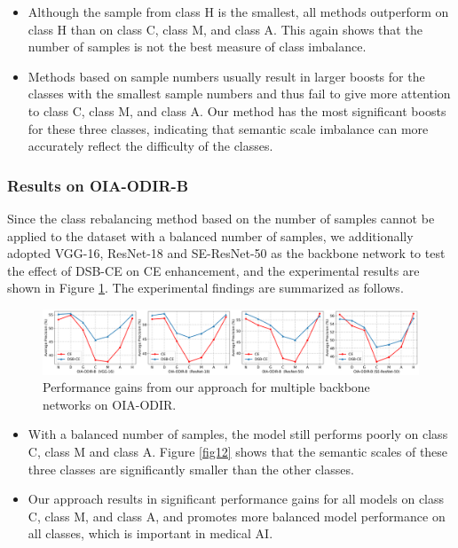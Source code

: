 \documentclass[10pt]{article} %
\begin{document}
\begin{itemize}
    \item Although the sample from class H is the smallest, all methods outperform on class H than on class C, class M, and class A. This again shows that the number of samples is not the best measure of class imbalance.
    \item Methods based on sample numbers usually result in larger boosts for the classes with the smallest sample numbers and thus fail to give more attention to class C, class M, and class A. Our method has the most significant boosts for these three classes, indicating that semantic scale imbalance can more accurately reflect the difficulty of the classes.
\end{itemize}


\subsubsection{Results on OIA-ODIR-B} 
Since the class rebalancing method based on the number of samples cannot be applied to the dataset with a balanced number of samples, we additionally adopted VGG-16, ResNet-18 and SE-ResNet-50 as the backbone network to test the effect of DSB-CE on CE enhancement, and the experimental results are shown in Figure \ref{fig14}. The experimental findings are summarized as follows.

\begin{figure}[h]
\begin{center}
\includegraphics[width=1\columnwidth]{fig14}
\vskip -0.05in
\caption{Performance gains from our approach for multiple backbone networks on OIA-ODIR.}
\label{fig14}
\end{center}
\vskip -0.15in
\end{figure}

\begin{itemize}
    \item With a balanced number of samples, the model still performs poorly on class C, class M and class A. Figure \ref{fig12} shows that the semantic scales of these three classes are significantly smaller than the other classes.
    \item Our approach results in significant performance gains for all models on class C, class M, and class A, and promotes more balanced model performance on all classes, which is important in medical AI.
\end{itemize}
\end{document}
